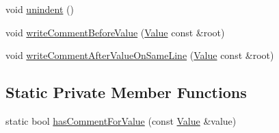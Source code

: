 \begin{DoxyCompactItemize}
\item 
void \hyperlink{structJson_1_1BuiltStyledStreamWriter_a0da6c6f603e00c8c6e38af553edd8c55_a0da6c6f603e00c8c6e38af553edd8c55}{unindent} ()
\item 
void \hyperlink{structJson_1_1BuiltStyledStreamWriter_a32c4afca4e08fba79bb0a80a8010283a_a32c4afca4e08fba79bb0a80a8010283a}{write\+Comment\+Before\+Value} (\hyperlink{classJson_1_1Value}{Value} const \&root)
\item 
void \hyperlink{structJson_1_1BuiltStyledStreamWriter_a89625b134fce0255263ca40e6125742b_a89625b134fce0255263ca40e6125742b}{write\+Comment\+After\+Value\+On\+Same\+Line} (\hyperlink{classJson_1_1Value}{Value} const \&root)
\end{DoxyCompactItemize}
\subsection*{Static Private Member Functions}
\begin{DoxyCompactItemize}
\item 
static bool \hyperlink{structJson_1_1BuiltStyledStreamWriter_a457c2f3c1e8c952caeb60e52477d0c9a_a457c2f3c1e8c952caeb60e52477d0c9a}{has\+Comment\+For\+Value} (const \hyperlink{classJson_1_1Value}{Value} \&value)
\end{DoxyCompactItemize}

